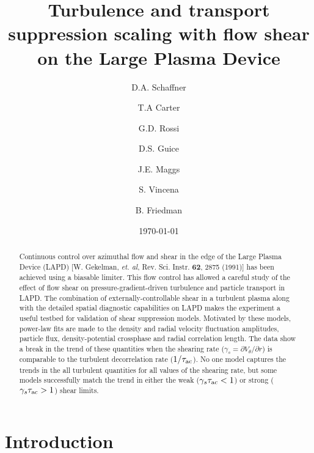 \documentclass[aip,pop,amsmath,amssymb,preprint,superscriptaddress]{revtex4-1} %
\begin{document}
\title{Turbulence and transport suppression scaling with flow shear on the Large Plasma Device}
\author{D.A. Schaffner}
\author{T.A Carter}
\author{G.D. Rossi}
\author{D.S. Guice}
\author{J.E. Maggs}
\author{S. Vincena}
\author{B. Friedman}
\date{\today}
\begin{abstract}
Continuous control over azimuthal flow and shear in the edge of the
Large Plasma Device (LAPD) [W. Gekelman, \textit{et. al},
  Rev. Sci. Instr. \textbf{62}, 2875 (1991)] has been achieved using a
biasable limiter.  This flow control has allowed a careful study of
the effect of flow shear on pressure-gradient-driven turbulence and
particle transport in LAPD. The combination of externally-controllable
shear in a turbulent plasma along with the detailed spatial diagnostic
capabilities on LAPD makes the experiment a useful testbed for
validation of shear suppression models. Motivated by these models,
power-law fits are made to the density and radial velocity fluctuation
amplitudes, particle flux, density-potential crossphase and radial
correlation length.  The data show a break in the trend of these
quantities  when the shearing rate ($\gamma_s = \partial
V_\theta/\partial r$) is comparable to the turbulent decorrelation
rate ($1/\tau_{\rm ac}$).  No one model captures the trends in the
all turbulent quantities for all values of  the shearing rate, but
some models successfully match the trend in either the weak
($\gamma_s \tau_{\rm ac} < 1$) or strong ($\gamma_s \tau_{\rm ac} >
1$) shear limits. 
\end{abstract}
\maketitle

\section{Introduction}
\end{document}
